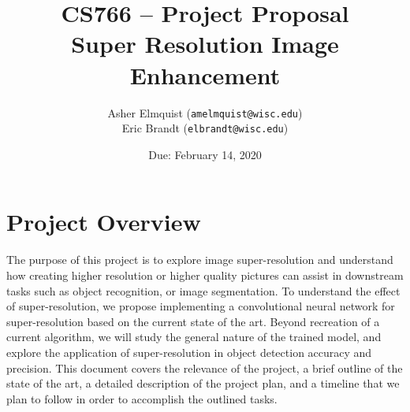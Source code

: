 \documentclass{article}
\title{CS766 -- Project Proposal \\ Super Resolution Image Enhancement}
\author{Asher Elmquist (\texttt{amelmquist@wisc.edu}) \\
Eric Brandt (\texttt{elbrandt@wisc.edu})
}
\date{Due: February 14, 2020}
\begin{document}
\maketitle


\section{Project Overview}
The purpose of this project is to explore image super-resolution and understand how creating higher resolution or higher quality pictures can assist in downstream tasks such as object recognition, or image segmentation. To understand the effect of super-resolution, we propose implementing a convolutional neural network for super-resolution based on the current state of the art. Beyond recreation of a current algorithm, we will study the general nature of the trained model, and explore the application of super-resolution in object detection accuracy and precision. This document covers the relevance of the project, a brief outline of the state of the art, a detailed description of the project plan, and a timeline that we plan to follow in order to accomplish the outlined tasks. 
\end{document}
